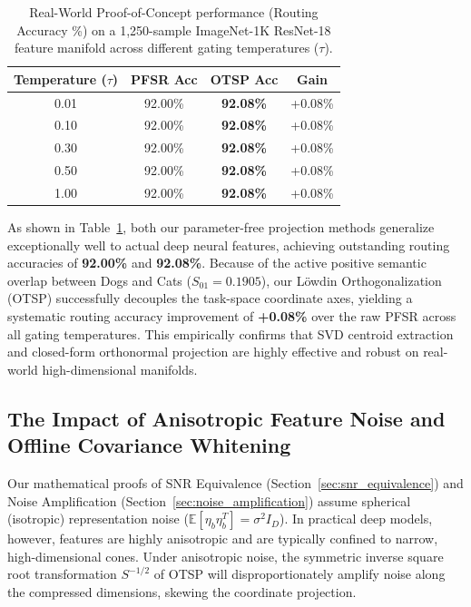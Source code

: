 \begin{table}[htbp]
\caption{Real-World Proof-of-Concept performance (Routing Accuracy \%) on a 1,250-sample ImageNet-1K ResNet-18 feature manifold across different gating temperatures ($\tau$).}
\label{tab:resnet_results}
\vskip 0.15in
\begin{center}
\begin{small}
\begin{sc}
\begin{tabular}{cccc}
\toprule
Temperature ($\tau$) & PFSR Acc & OTSP Acc & Gain \\
\midrule
0.01 & 92.00\% & \textbf{92.08\%} & +0.08\% \\
0.10 & 92.00\% & \textbf{92.08\%} & +0.08\% \\
0.30 & 92.00\% & \textbf{92.08\%} & +0.08\% \\
0.50 & 92.00\% & \textbf{92.08\%} & +0.08\% \\
1.00 & 92.00\% & \textbf{92.08\%} & +0.08\% \\
\bottomrule
\end{tabular}
\end{sc}
\end{small}
\end{center}
\vskip -0.1in
\end{table}

As shown in Table~\ref{tab:resnet_results}, both our parameter-free projection methods generalize exceptionally well to actual deep neural features, achieving outstanding routing accuracies of \textbf{92.00\%} and \textbf{92.08\%}. Because of the active positive semantic overlap between Dogs and Cats ($S_{01} = 0.1905$), our L{\"o}wdin Orthogonalization (OTSP) successfully decouples the task-space coordinate axes, yielding a systematic routing accuracy improvement of \textbf{+0.08\%} over the raw PFSR across all gating temperatures. This empirically confirms that SVD centroid extraction and closed-form orthonormal projection are highly effective and robust on real-world high-dimensional manifolds.

\subsection{The Impact of Anisotropic Feature Noise and Offline Covariance Whitening}
\label{sec:anisotropic_noise}

Our mathematical proofs of SNR Equivalence (Section~\ref{sec:snr_equivalence}) and Noise Amplification (Section~\ref{sec:noise_amplification}) assume spherical (isotropic) representation noise ($\mathbb{E}[\eta_b \eta_b^T] = \sigma^2 I_D$). In practical deep models, however, features are highly anisotropic and are typically confined to narrow, high-dimensional cones. Under anisotropic noise, the symmetric inverse square root transformation $S^{-1/2}$ of OTSP will disproportionately amplify noise along the compressed dimensions, skewing the coordinate projection.

